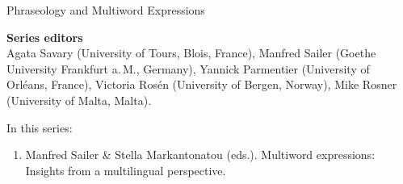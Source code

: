 {\large Phraseology and Multiword Expressions}

\bigskip

\textbf{Series editors}\\
    Agata Savary (University of Tours, Blois, France),
    Manfred Sailer (Goethe University Frankfurt a.\,M., Germany),
    Yannick Parmentier (University of Orléans, France),
    Victoria Rosén (University of Bergen, Norway),
    Mike Rosner (University of Malta, Malta).

  \bigskip

In this series:

\begin{enumerate}
\item Manfred Sailer \& Stella Markantonatou (eds.). Multiword expressions: Insights from a multilingual perspective.
\end{enumerate}


